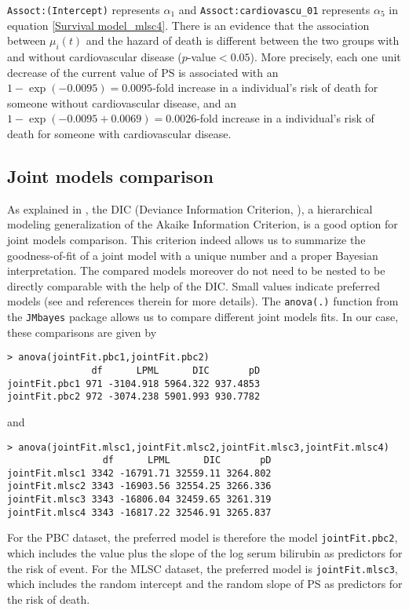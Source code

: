 \documentclass[12pt]{article}
\begin{document}
\texttt{Assoct:(Intercept)} represents $\alpha_1$ and \texttt{Assoct:cardiovascu\_01} represents $\alpha_5$ in equation \eqref{Survival model_mlsc4}. There is an evidence that the
association between $\mu_i(t)$ and the hazard of death is different between the two groups with and without cardiovascular disease ($p$-value$<0.05$). More precisely, each one unit decrease of the current value of PS is associated with an $1-\exp(-0.0095) =  0.0095$-fold increase in a individual's risk of death for someone without cardiovascular disease, and an $1-\exp(-0.0095+0.0069) = 0.0026$-fold increase in a individual's risk of death for someone with cardiovascular disease.


\subsection{Joint models comparison}
\label{joint models comparison}
As explained in \cite{GuoCarlin}, the DIC (Deviance Information Criterion,  \cite{Spiegelhalter}), a hierarchical modeling generalization of the Akaike Information Criterion, is a good option for joint models comparison. This criterion indeed allows us to summarize the goodness-of-fit of a joint model with a unique number and a proper Bayesian interpretation. The compared models moreover do not need to be nested to be directly comparable with the help of the DIC. Small values indicate preferred models (see \cite{GuoCarlin} and references therein for more details). The \texttt{anova(.)} function from the \texttt{JMbayes} package allows us to compare different joint models fits. In our case, these comparisons are given by
\begin{verbatim}
> anova(jointFit.pbc1,jointFit.pbc2)
               df      LPML      DIC       pD
jointFit.pbc1 971 -3104.918 5964.322 937.4853
jointFit.pbc2 972 -3074.238 5901.993 930.7782
\end{verbatim}
and 
\begin{verbatim}
> anova(jointFit.mlsc1,jointFit.mlsc2,jointFit.mlsc3,jointFit.mlsc4)
                 df      LPML      DIC       pD
jointFit.mlsc1 3342 -16791.71 32559.11 3264.802
jointFit.mlsc2 3343 -16903.56 32554.25 3266.336
jointFit.mlsc3 3343 -16806.04 32459.65 3261.319
jointFit.mlsc4 3343 -16817.22 32546.91 3265.837
\end{verbatim}
For the PBC dataset, the preferred model is therefore the model \texttt{jointFit.pbc2}, which includes the value plus the slope of the log serum bilirubin as predictors for the risk of event. For the MLSC dataset, the preferred model is \texttt{jointFit.mlsc3}, which includes the random intercept and the random slope of PS as predictors for the risk of death.
\end{document}

